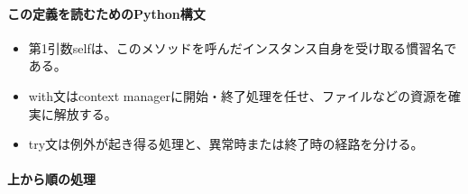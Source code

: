 \documentclass[a4paper,11pt]{article}
\begin{document}
            \paragraph{この定義を読むためのPython構文}
            \begin{itemize}[leftmargin=1.6em]
            \item 第1引数selfは、このメソッドを呼んだインスタンス自身を受け取る慣習名である。
\item with文はcontext managerに開始・終了処理を任せ、ファイルなどの資源を確実に解放する。
\item try文は例外が起き得る処理と、異常時または終了時の経路を分ける。
            \end{itemize}
            \paragraph{上から順の処理}
\end{document}
